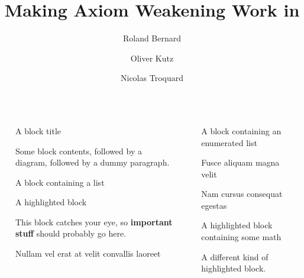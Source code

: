 \documentclass[final]{beamer}
\title{Making Axiom Weakening Work in \SROIQ}
\author{Roland Bernard \and Oliver Kutz \and Nicolas Troquard}
\institute[shortinst]{Free University of Bozen-Bolzano}
\newlength{\sepwidth}
\newlength{\colwidth}
\newcommand{\separatorcolumn}{\begin{column}{\sepwidth}\end{column}}
\begin{document}
\begin{frame}[t]
\begin{columns}[t]
\separatorcolumn

\begin{column}{\colwidth}

  \begin{block}{A block title}

    Some block contents, followed by a diagram, followed by a dummy paragraph.

  \end{block}

  \begin{block}{A block containing a list}

  \end{block}

  \begin{alertblock}{A highlighted block}

    This block catches your eye, so \textbf{important stuff} should probably go
    here.

  \end{alertblock}

 \begin{block}{Nullam vel erat at velit convallis laoreet}

  \end{block}

\end{column}

\separatorcolumn

\begin{column}{\colwidth}

  \begin{block}{A block containing an enumerated list}

  \end{block}

  \begin{block}{Fusce aliquam magna velit}

  \end{block}

  \begin{block}{Nam cursus consequat egestas}

  \end{block}

  \begin{exampleblock}{A highlighted block containing some math}

    A different kind of highlighted block.

  \end{exampleblock}

\end{column}
\separatorcolumn

\end{columns}
\end{frame}
\end{document}
